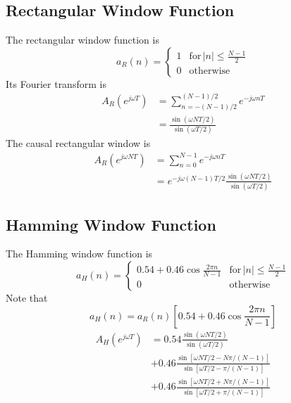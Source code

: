 \documentclass[11pt]{book}
\theoremstyle{example}
\begin{document}
\subsection{Rectangular Window Function}
The rectangular window function is
\begin{equation}
	a_R(n)=
	\begin{cases}
		1 & \mathrm{for}\,|n|\leq\frac{N-1}{2}\\
		0 & \mathrm{otherwise}
	\end{cases}
\end{equation}
Its Fourier transform is
\begin{equation}
	\begin{split}
		A_R(e^{j{\omega}T})&=\sum_{n=-(N-1)/2}^{(N-1)/2}{e^{-j{\omega}nT}}\\
		&=\frac{\sin{({\omega}NT/2)}}{\sin{({\omega}T/2)}}
	\end{split}
\end{equation}
The causal rectangular window is
\begin{equation}
	\begin{split}
		A_R(e^{j{\omega}NT})&=\sum_{n=0}^{N-1}{e^{-j{\omega}nT}}\\
		&=e^{-j\omega(N-1)T/2}\frac{\sin{({\omega}NT/2)}}{\sin{({\omega}T/2)}}
	\end{split}
\end{equation}

\subsection{Hamming Window Function}
The Hamming window function is
\begin{equation}
	a_H(n)=
	\begin{cases}
		0.54+0.46\cos{\frac{2{\pi}n}{N-1}} & \mathrm{for}\,|n|\leq\frac{N-1}{2}\\
		0 & \mathrm{otherwise}
	\end{cases}
\end{equation}
Note that
\begin{equation}
	a_H(n)=a_R(n)\left[0.54+0.46\cos{\frac{2{\pi}n}{N-1}}\right]
\end{equation}
\begin{equation}
	\begin{split}
		A_H(e^{j{\omega}T})&=0.54\frac{\sin{({\omega}NT/2)}}{\sin{({\omega}T/2)}}\\
		&+0.46\frac{\sin{[{\omega}NT/2-N\pi/(N-1)]}}{\sin{[{\omega}T/2-\pi/(N-1)]}}\\
		&+0.46\frac{\sin{[{\omega}NT/2+N\pi/(N-1)]}}{\sin{[{\omega}T/2+\pi/(N-1)]}}
	\end{split}
\end{equation}
\end{document}
